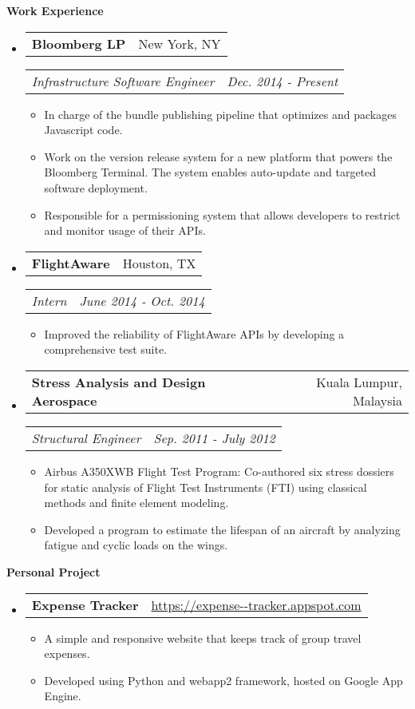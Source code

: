 \documentclass[letterpaper,11pt]{article}
\makeatletter
\newcommand{\resitem}[1]{\item #1 \vspace{-2pt}}
\newcommand{\resheading}[1]{{\begin{mdframed}[backgroundcolor=mygray]{\large \textbf{#1}}\end{mdframed}}}
\newcommand{\restitle}[2]{
\begin{tabular*}{7.0in}{l@{\extracolsep{\fill}}r}
		\textbf{#1} & #2 \\
\end{tabular*}}
\newcommand{\ressubtitle}[2]{
\begin{tabular*}{7.0in}{l@{\extracolsep{\fill}}r}
		\textit{#1} & \textit{#2} \\
\end{tabular*}\vspace{-6pt}}
\makeatother
\begin{document}
\resheading{Work Experience}
\begin{itemize}

\item
	\restitle{Bloomberg LP}{New York, NY}
	\ressubtitle{Infrastructure Software Engineer}{Dec. 2014 - Present}
	\begin{itemize}
		\resitem{In charge of the bundle publishing pipeline that optimizes and packages Javascript code.}
		\resitem{Work on the version release system for a new platform that powers the Bloomberg Terminal.
		         The system enables auto-update and targeted software deployment.}
		\resitem{Responsible for a permissioning system that allows developers to restrict and monitor usage of their APIs.}
	\end{itemize}

\item
	\restitle{FlightAware}{Houston, TX}
	\ressubtitle{Intern}{June 2014 - Oct. 2014}
	\begin{itemize}
		\resitem{Improved the reliability of FlightAware APIs by developing a comprehensive test suite.}
	\end{itemize}

\item
	\restitle{Stress Analysis and Design Aerospace}{Kuala Lumpur, Malaysia}
	\ressubtitle{Structural Engineer}{Sep. 2011 - July 2012}
	\begin{itemize}
		\resitem{Airbus A350XWB Flight Test Program: Co-authored six stress dossiers for static analysis of Flight Test Instruments (FTI) using classical methods and finite element modeling.}
		\resitem{Developed a program to estimate the lifespan of an aircraft by analyzing fatigue and cyclic loads on the wings.}
	\end{itemize}

\end{itemize}

\resheading{Personal Project}

\begin{itemize}
\item
	\restitle{Expense Tracker}{\href{https://expense--tracker.appspot.com/}{https://expense-{}-tracker.appspot.com}}
	\vspace{-6pt}
	\begin{itemize}
		\resitem{A simple and responsive website that keeps track of group travel expenses.}
		\resitem{Developed using Python and webapp2 framework, hosted on Google App Engine.}
	\end{itemize}
\end{itemize}
\end{document}
